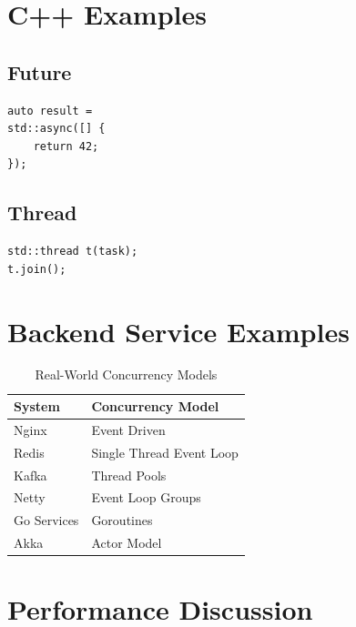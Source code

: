 \section{C++ Examples}

\subsection{Future}

\begin{verbatim}
auto result =
std::async([] {
    return 42;
});
\end{verbatim}

\subsection{Thread}

\begin{verbatim}
std::thread t(task);
t.join();
\end{verbatim}

\section{Backend Service Examples}

\begin{table}[h]
\centering
\begin{tabular}{|p{5cm}|p{7cm}|}
\hline
System & Concurrency Model \\
\hline
Nginx & Event Driven \\
\hline
Redis & Single Thread Event Loop \\
\hline
Kafka & Thread Pools \\
\hline
Netty & Event Loop Groups \\
\hline
Go Services & Goroutines \\
\hline
Akka & Actor Model \\
\hline
\end{tabular}
\caption{Real-World Concurrency Models}
\end{table}

\section{Performance Discussion}

